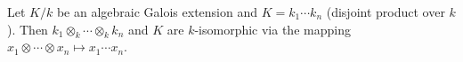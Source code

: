 Let $K/k$ be an algebraic Galois extension and $K = k_1 \cdots k_n$ (disjoint product over $k$). Then $k_1 \otimes_k \cdots \otimes_k k_n$ and $K$ are $k$-isomorphic via the mapping $x_1 \otimes \cdots \otimes x_n \mapsto x_1 \cdots x_n$.
